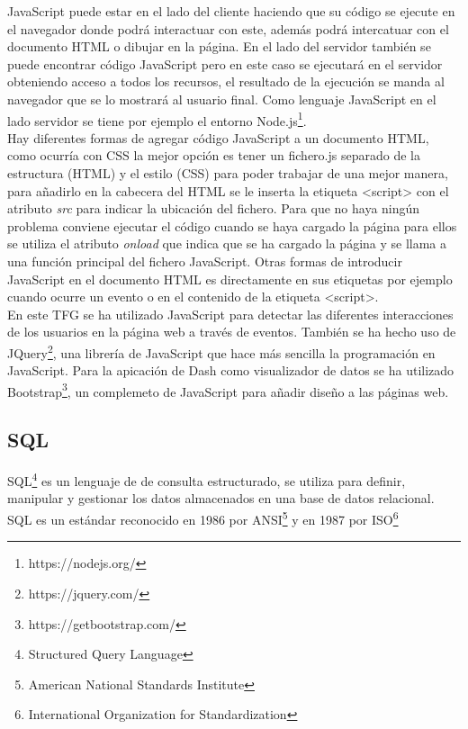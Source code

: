 JavaScript puede estar en el lado del cliente haciendo que su código se ejecute en el navegador donde podrá interactuar con este, además podrá intercatuar con el documento HTML o dibujar en la página. En el lado del servidor también se puede encontrar código JavaScript pero en este caso se ejecutará en el servidor obteniendo acceso a todos los recursos, el resultado de la ejecución se manda al navegador que se lo mostrará al usuario final. Como lenguaje JavaScript en el lado servidor se tiene por ejemplo el entorno Node.js\footnote{https://nodejs.org/}.\cite{juan4}\\

Hay diferentes formas de agregar código JavaScript a un documento HTML, como ocurría con CSS la mejor opción es tener un fichero.js separado de la estructura (HTML) y el estilo (CSS) para poder trabajar de una mejor manera, para añadirlo en la cabecera del HTML se le inserta la etiqueta {\textless script\textgreater} con el atributo \textit{src} para indicar la ubicación del fichero. Para que no haya ningún problema conviene ejecutar el código cuando se haya cargado la página para ellos se utiliza el atributo \textit{onload} que indica que se ha cargado la página y se llama a una función principal del fichero JavaScript. Otras formas de introducir JavaScript en el documento HTML es directamente en sus etiquetas por ejemplo cuando ocurre un evento o  en el contenido de la etiqueta {\textless script\textgreater}.\cite{js}\\

En este TFG se ha utilizado JavaScript para detectar las diferentes interacciones de los usuarios en la página web a través de eventos. También se ha hecho uso de JQuery\footnote{https://jquery.com/}, una librería de JavaScript que hace más sencilla la programación en JavaScript. Para la apicación de Dash como visualizador de datos se ha utilizado Bootstrap\footnote{https://getbootstrap.com/}, un complemeto de JavaScript para añadir diseño a las páginas web.

\subsection{SQL}
SQL\footnote{Structured Query Language} es un lenguaje de de consulta estructurado, se utiliza para definir, manipular y gestionar los datos almacenados en una base de datos relacional. SQL es un estándar reconocido en 1986 por ANSI\footnote{American National Standards Institute} y en 1987 por ISO\footnote{International Organization for Standardization}\\

